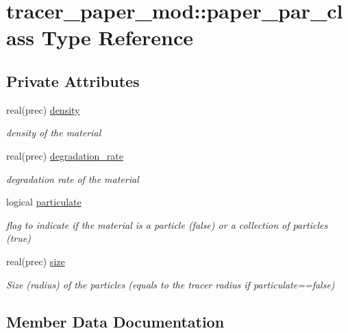 \hypertarget{structtracer__paper__mod_1_1paper__par__class}{}\section{tracer\+\_\+paper\+\_\+mod\+:\+:paper\+\_\+par\+\_\+class Type Reference}
\label{structtracer__paper__mod_1_1paper__par__class}
\subsection*{Private Attributes}
\begin{DoxyCompactItemize}
\item 
real(prec) \hyperlink{structtracer__paper__mod_1_1paper__par__class_ace47f01093c339db1b5514f136a98c25}{density}
\begin{DoxyCompactList}\small\item\em density of the material \end{DoxyCompactList}\item 
real(prec) \hyperlink{structtracer__paper__mod_1_1paper__par__class_ac9893368ff4ec076f4604d749c2bb391}{degradation\+\_\+rate}
\begin{DoxyCompactList}\small\item\em degradation rate of the material \end{DoxyCompactList}\item 
logical \hyperlink{structtracer__paper__mod_1_1paper__par__class_a794fb1c69237803f68cb68143273242c}{particulate}
\begin{DoxyCompactList}\small\item\em flag to indicate if the material is a particle (false) or a collection of particles (true) \end{DoxyCompactList}\item 
real(prec) \hyperlink{structtracer__paper__mod_1_1paper__par__class_aeb0b4d046983cd2f631822e80e1600c4}{size}
\begin{DoxyCompactList}\small\item\em Size (radius) of the particles (equals to the tracer radius if particulate==false) \end{DoxyCompactList}\end{DoxyCompactItemize}


\subsection{Member Data Documentation}
\mbox{\label{structtracer__paper__mod_1_1paper__par__class_ac9893368ff4ec076f4604d749c2bb391}} 
